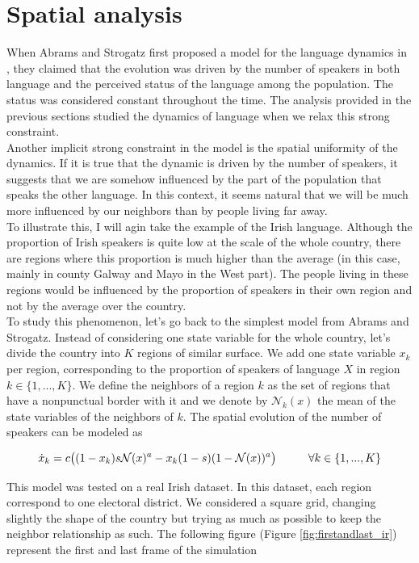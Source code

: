 \documentclass{article}
\begin{document}
\section{Spatial analysis}
\label{sec:spatial}
When Abrams and Strogatz first proposed a model for the language dynamics in \cite{death}, they claimed that the evolution was driven by the number of speakers in both language and the perceived status of the language among the population.
The status was considered constant throughout the time.
The analysis provided in the previous sections studied the dynamics of language when we relax this strong constraint. \\
Another implicit strong constraint in the model is the spatial uniformity of the dynamics.
If it is true that the dynamic is driven by the number of speakers, it suggests that we are somehow influenced by the part of the population that speaks the other language.
In this context, it seems natural that we will be much more influenced by our neighbors than by people living far away. \\
To illustrate this, I will agin take the example of the Irish language.
Although the proportion of Irish speakers is quite low at the scale of the whole country, there are regions where this proportion is much higher than the average (in this case, mainly in county Galway and Mayo in the West part).
The people living in these regions would be influenced by the proportion of speakers in their own region and not by the average over the country.\\
To study this phenomenon, let's go back to the simplest model from Abrams and Strogatz.
Instead of considering one state variable for the whole country, let's divide the country into $K$ regions of similar surface.
We add one state variable $x_k$ per region, corresponding to the proportion of speakers of language $X$ in region $k \in \{ 1, ..., K\}$.
We define the neighbors of a region $k$ as the set of regions that have a nonpunctual border with it and we denote by $\mathcal{N}_k(x)$ the mean of the state variables of the neighbors of $k$.
The spatial evolution of the number of speakers can be modeled as

\begin{equation}
\dot{x}_k = c\big( (1-x_k)s\mathcal{N}(x)^a - x_k(1-s)(1-\mathcal{N}(x))^a \big) \hspace{1cm} \forall k \in \{1,...,K\}
\end{equation}

This model was tested on a real Irish dataset.
In this dataset, each region correspond to one electoral district.
We considered a square grid, changing slightly the shape of the country but trying as much as possible to keep the neighbor relationship as such.
The following figure (Figure \ref{fig:firstandlast_ir}) represent the first and last frame of the simulation
\end{document}
